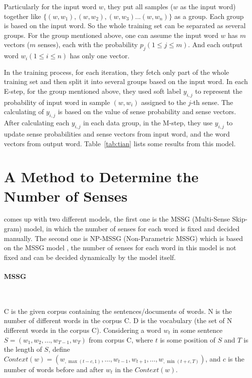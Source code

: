 Particularly for the input word $w$, they put all samples ($w$ as the input word) together like $\{(w, w_1), (w, w_2), (w, w_3) ... (w, w_n)\}$ as a group. Each group is based on the input word. So the whole training set can be separated as several groups. For the group mentioned above, one can assume the input word $w$ has $m$ vectors ($m$ senses), each with the probability $p_j (1 \leq j \leq m)$. And each output word $w_i (1 \leq i\leq n)$ has only one vector. 

 In the training process, for each iteration, they fetch only part of the whole training set and then split it into several groups based on the input word. In each E-step, for the group mentioned above, they used soft label $y_{i,j}$ to represent the probability of input word in sample $(w,w_i)$ assigned to the $j$-th sense. The calculating of $y_{i,j}$ is based on the value of sense probability and sense vectors. After calculating each $y_{i,j}$ in each data group, in the M-step, they use $y_{i,j}$ to update sense probabilities and sense vectors from input word, and the word vectors from output word. Table~\ref{tab:tian} lists some results from this model.

\section{A Method to Determine the Number of Senses}
\cite{neelakantan2015efficient} comes up with two different models, the first one is the MSSG (Multi-Sense Skip-gram) model, in which the number of senses for each word is fixed and decided manually. The second one is NP-MSSG  (Non-Parametric MSSG) which is based on the MSSG model , the number of senses for each word in this model is not fixed and can be decided dynamically by the model itself.


\paragraph{MSSG}\

\gls{C} is the given corpus containing the sentences/documents of words. \gls{N} is the number of different words in the corpus \gls{C}. \gls{D} is the vocabulary (the set of \gls{N} different words in the corpus \gls{C}). Considering a word $w_t$ in some sentence $S = (w_1,w_2,\ldots,w_{T-1},w_{T})$ from corpus \gls{C}, where $t$ is some position of $S$ and $T$ is the length of $S$, define $Context(w) = (w_{,\max(t-c,1)},\ldots,w_{t-1},w_{t+1},\ldots,w_{,\min(t+c,T)})$, and $c$ is the number of words before and after $w_t$ in the $Context(w)$. 


